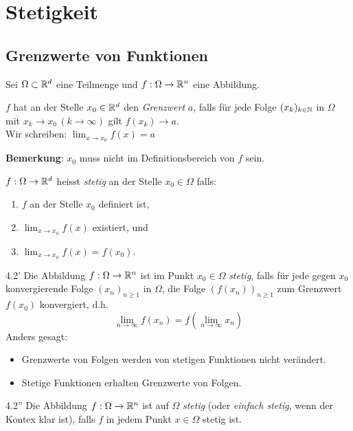 \chapter{Stetigkeit}
\section{Grenzwerte von Funktionen}
Sei $\Omega \subset \mathbb{R}^{d}$ eine Teilmenge und $f:\Omega \to \mathbb{R}^{n}$ eine Abbildung.

\begin{definition}{4.1}
$f$ hat an der Stelle $x_{0} \in \mathbb{R}^{d}$ den \emph{Grenzwert} $a$, falls für jede Folge $(x_k)_{k\in \mathbb{N}}$ in $\Omega$ mit $x_{k} \to x_{0}\, (k \to \infty)$ gilt $f(x_{k}) \to a$. \\

Wir schreiben: $\lim_{x\to x_{0}}{f(x)} = a$
\end{definition}
\textbf{Bemerkung}: $x_{0}$ muss nicht im Definitionsbereich von $f$ sein.
\begin{definition}{4.2}
$f:\Omega \to \mathbb{R}^{d}$ heisst \emph{stetig} an der Stelle $x_{0} \in \Omega$ falls:
\begin{enumerate}
\item $f$ an der Stelle $x_{0}$ definiert ist,
\item $\lim_{x\to x_{0}}{f(x)}$ existiert, und
\item $\lim_{x\to x_{0}}{f(x)} = f(x_{0})$.
\end{enumerate}
\end{definition}
\begin{definition}{4.2'}
Die Abbildung $f:\Omega \to \mathbb{R}^{n}$ ist im Punkt $x_{0} \in \Omega$ \emph{stetig}, falls für jede gegen $x_{0}$ konvergierende Folge $(x_{n})_{n\geq 1}$ in $\Omega$, die Folge $(f(x_{n}))_{n\geq 1}$ zum Grenzwert $f(x_{0})$ konvergiert, d.h.
\[\lim_{n\to\infty}f(x_{n}) = f(\lim_{n\to\infty}x_{n})\]
Anders gesagt:
\begin{itemize}
\item Grenzwerte von Folgen werden von stetigen Funktionen nicht verändert.
\item Stetige Funktionen erhalten Grenzwerte von Folgen.
\end{itemize}
\end{definition}
\begin{definition}{4.2''}
Die Abbildung $f:\Omega\to\mathbb{R}^{n}$ ist auf $\Omega$ \emph{stetig} (oder \emph{einfach stetig}, wenn der Kontex klar ist), falls $f$ in jedem Punkt $x\in\Omega$ stetig ist.
\end{definition}
